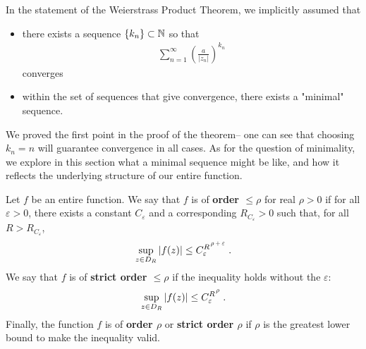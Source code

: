 \documentclass{memoir}
\begin{document}



In the statement of the Weierstrass Product Theorem, we implicitly assumed that
\begin{itemize}
	\item there exists a sequence \(\left\{ k_n \right\} \subset \mathbb{N}\) so that
		\begin{align*}
			\sum_{n=1}^{\infty} \left( \frac{a}{\left| z_n \right| } \right)^{k_n}
		\end{align*}
		converges
	\item within the set of sequences that give convergence, there exists a "minimal" sequence.
\end{itemize}
We proved the first point in the proof of the theorem-- one can see that choosing \(k_n = n\) will guarantee convergence in all cases. As for the question of minimality, we explore in this section what a minimal sequence might be like, and how it reflects the underlying structure of our entire function.

\begin{defn}
	Let \(f\) be an entire function. We say that \(f\) is of \textbf{order \(\leq \rho \)} for real \(\rho >0\) if for all \(\varepsilon>0\), there exists a constant \(C_\varepsilon\) and a corresponding \(R_{C_\varepsilon} >0\) such that, for all \(R>R_{C_\varepsilon}\),
	\begin{align*}
		\sup_{z \in D_R} \left| f(z) \right| \leq C_\varepsilon^{R \raisebox{+4pt}{\scalebox{0.65}{\(\,\rho +\varepsilon\)} } }.
	\end{align*}
	We say that \(f\) is of \textbf{strict order \(\leq \rho \)} if the inequality holds without the \(\varepsilon\):
	\begin{align*}
		\sup_{z \in D_R} \left| f(z) \right| \leq C_\varepsilon^{R \raisebox{+4pt}{\scalebox{0.65}{\(\,\rho\)} } }.
	\end{align*}
	Finally, the function \(f\) is of \textbf{order \(\rho \)} or \textbf{strict order \(\rho \)} if \(\rho \) is the greatest lower bound to make the inequality valid.
\end{defn}
\end{document}
